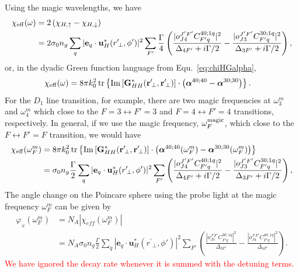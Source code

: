 \documentclass[preprint,aps,pra,onecolumn]{revtex4-1} %
\begin{document}
Using the magic wavelengths, we have 
\begin{align}
\chi_{\rm eff} (\omega) &= 2\left( \chi_{H,\uparrow} -\chi_{H,\downarrow} \right)\\
&= 2\sigma_0 n_g \sum_q |\mathbf{e}_q\cdot \mathbf{u}_H^*(r^\prime\!_\perp,\phi')|^2 \sum_{F'} 
\frac{\Gamma}{4} \left( \frac{|o^{J'F'}_{J4} C^{4 0;1q}_{F' q}|^2 }{\Delta_{4F'}+i\Gamma/2} - 
\frac{|o^{J'F'}_{J3} C^{3 0;1q}_{F' q}|^2 }{\Delta_{3F'}+i\Gamma/2}  \right),
\end{align}
or, in the dyadic Green function language from Equ.~\ref{eq:chiHGalpha}, 
\begin{align}
\chi_{\rm eff} (\omega)
&=  8\pi k_0^2 \operatorname{tr} \left\{ \mathrm{Im}\left[ 
\mathbf{G}^*_{HH}(\mathbf{r}^\prime\!_\perp,\mathbf{r}^\prime\!_\perp) \right] \cdot \left( 
\boldsymbol{\alpha}^{40;40} - \boldsymbol{\alpha}^{30;30} \right) 
\right\} . 
\end{align}
For the $ D_1 $ line transition, for example, there are two magic frequencies at $ \omega_3^m $ and $ \omega_4^m $ which close to the $ F=3 
\leftrightarrow F'=3 $ and $ F=4\leftrightarrow F'=4 $ transitions, respectively. In general, if we use the magic frequency, $ \omega_F^{\rm magic} $, which close to the $ F\leftrightarrow 
F'=F $ 
transition, we would have
\begin{align}
\chi_{\rm eff} (\omega_F^m) &= 8\pi k_0^2 \operatorname{tr} \left\{ \mathrm{Im}\left[ 
\mathbf{G}^*_{HH}(\mathbf{r}^\prime\!_\perp,\mathbf{r}^\prime\!_\perp) \right] \cdot \left( \boldsymbol{\alpha}^{40;40}(\omega_F^m) -   \boldsymbol{\alpha}^{30;30}(\omega_F^m) \right) 
\right\}\\
&= \sigma_0 n_g \frac{\Gamma}{2} \sum_q |\mathbf{e}_q\cdot 
\mathbf{u}_H^*(r^\prime\!_\perp,\phi')|^2 \sum_{F'} 
 \left( \frac{|o^{J'F'}_{J4} C^{4 0;1q}_{F' q}|^2 }{\Delta_{4F'}+i\Gamma/2} - 
 \frac{|o^{J'F'}_{J3} C^{3 0;1q}_{F' q}|^2 }{\Delta_{3F'}+i\Gamma/2}  \right),
\end{align}
The angle change on the Poincare sphere using the probe light at the magic frequency $ \omega_F^m $ can be given by
\begin{align}
\varphi_{_N} (\omega_F^m) &= N_A \left| \chi_{e\!f\!f} (\omega_F^m) \right| \\
&=   N_A \sigma_0 n_g\frac{\Gamma}{2} \sum_q |\mathbf{e}_q\cdot 
\mathbf{u}_H^*(r^\prime\!_\perp,\phi')|^2 
\sum_{F'}  \left( \frac{|o^{J'F'}_{J3} C^{3 0;1q}_{F' q}|^2 }{\Delta_{3F'} } - 
 \frac{|o^{J'F'}_{J4} C^{4 0;1q}_{F' q}|^2 }{\Delta_{4F'}}  \right).
\end{align} 
\textcolor{red}{We have ignored the decay rate whenever it is summed with the detuning terms.}
\end{document}
